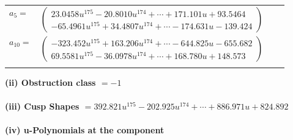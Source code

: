 \documentclass[1p]{elsarticle_modified}
\theoremstyle{definition}
\begin{document}
\begin{tabular}{m{7pt} m{180pt} m{7pt} m{180pt} }
\flushright $a_{5}=$&$\begin{pmatrix}23.0458 u^{175}-20.8010 u^{174}+\cdots+171.101 u+93.5464\\-65.4961 u^{175}+34.4807 u^{174}+\cdots-174.631 u-139.424\end{pmatrix}$ \\
\flushright $a_{10}=$&$\begin{pmatrix}-323.452 u^{175}+163.206 u^{174}+\cdots-644.825 u-655.682\\69.5581 u^{175}-36.0978 u^{174}+\cdots+168.780 u+148.573\end{pmatrix}$\\&\end{tabular}
\flushleft \textbf{(ii) Obstruction class $= -1$}\\~\\
\flushleft \textbf{(iii) Cusp Shapes $= 392.821 u^{175}-202.925 u^{174}+\cdots+886.971 u+824.892$}\\~\\
\newpage\renewcommand{\arraystretch}{1}
\flushleft \textbf{(iv) u-Polynomials at the component}\newline \\
\end{document}
